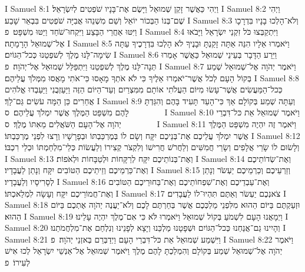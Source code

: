 I Samuel 8:1	וַיְהִי כַּאֲשֶׁר זָקֵן שְׁמוּאֵל וַיָּשֶׂם אֶת־בָּנָיו שֹׁפְטִים לְיִשְׂרָאֵל׃
I Samuel 8:2	וַיְהִי שֶׁם־בְּנוֹ הַבְּכוֹר יוֹאֵל וְשֵׁם מִשְׁנֵהוּ אֲבִיָּה שֹׁפְטִים בִּבְאֵר שָׁבַע׃
I Samuel 8:3	וְלֹא־הָלְכוּ בָנָיו בִּדְרָכָו וַיִּטּוּ אַחֲרֵי הַבָּצַע וַיִּקְחוּ־שֹׁחַד וַיַּטּוּ מִשְׁפָּט׃ {פ}
I Samuel 8:4	וַיִּתְקַבְּצוּ כֹּל זִקְנֵי יִשְׂרָאֵל וַיָּבֹאוּ אֶל־שְׁמוּאֵל הָרָמָתָה׃
I Samuel 8:5	וַיֹּאמְרוּ אֵלָיו הִנֵּה אַתָּה זָקַנְתָּ וּבָנֶיךָ לֹא הָלְכוּ בִּדְרָכֶיךָ עַתָּה שִׂימָה־לָּנוּ מֶלֶךְ לְשׁפְטֵנוּ כְּכל־הַגּוֹיִם׃
I Samuel 8:6	וַיֵּרַע הַדָּבָר בְּעֵינֵי שְׁמוּאֵל כַּאֲשֶׁר אָמְרוּ תְּנָה־לָּנוּ מֶלֶךְ לְשׁפְטֵנוּ וַיִּתְפַּלֵּל שְׁמוּאֵל אֶל־יְהֹוָה׃ {פ}
I Samuel 8:7	וַיֹּאמֶר יְהֹוָה אֶל־שְׁמוּאֵל שְׁמַע בְּקוֹל הָעָם לְכֹל אֲשֶׁר־יֹאמְרוּ אֵלֶיךָ כִּי לֹא אֹתְךָ מָאָסוּ כִּי־אֹתִי מָאֲסוּ מִמְּלֹךְ עֲלֵיהֶם׃
I Samuel 8:8	כְּכל־הַמַּעֲשִׂים אֲשֶׁר־עָשׂוּ מִיּוֹם הַעֲלֹתִי אוֹתָם מִמִּצְרַיִם וְעַד־הַיּוֹם הַזֶּה וַיַּעַזְבֻנִי וַיַּעַבְדוּ אֱלֹהִים אֲחֵרִים כֵּן הֵמָּה עֹשִׂים גַּם־לָךְ׃
I Samuel 8:9	וְעַתָּה שְׁמַע בְּקוֹלָם אַךְ כִּי־הָעֵד תָּעִיד בָּהֶם וְהִגַּדְתָּ לָהֶם מִשְׁפַּט הַמֶּלֶךְ אֲשֶׁר יִמְלֹךְ עֲלֵיהֶם׃ {ס}        
I Samuel 8:10	וַיֹּאמֶר שְׁמוּאֵל אֵת כּל־דִּבְרֵי יְהֹוָה אֶל־הָעָם הַשֹּׁאֲלִים מֵאִתּוֹ מֶלֶךְ׃ {ס}        
I Samuel 8:11	וַיֹּאמֶר זֶה יִהְיֶה מִשְׁפַּט הַמֶּלֶךְ אֲשֶׁר יִמְלֹךְ עֲלֵיכֶם אֶת־בְּנֵיכֶם יִקָּח וְשָׂם לוֹ בְּמֶרְכַּבְתּוֹ וּבְפָרָשָׁיו וְרָצוּ לִפְנֵי מֶרְכַּבְתּוֹ׃
I Samuel 8:12	וְלָשׂוּם לוֹ שָׂרֵי אֲלָפִים וְשָׂרֵי חֲמִשִּׁים וְלַחֲרֹשׁ חֲרִישׁוֹ וְלִקְצֹר קְצִירוֹ וְלַעֲשׂוֹת כְּלֵי־מִלְחַמְתּוֹ וּכְלֵי רִכְבּוֹ׃
I Samuel 8:13	וְאֶת־בְּנוֹתֵיכֶם יִקָּח לְרַקָּחוֹת וּלְטַבָּחוֹת וּלְאֹפוֹת׃
I Samuel 8:14	וְאֶת־שְׂדוֹתֵיכֶם וְאֶת־כַּרְמֵיכֶם וְזֵיתֵיכֶם הַטּוֹבִים יִקָּח וְנָתַן לַעֲבָדָיו׃
I Samuel 8:15	וְזַרְעֵיכֶם וְכַרְמֵיכֶם יַעְשֹׂר וְנָתַן לְסָרִיסָיו וְלַעֲבָדָיו׃
I Samuel 8:16	וְאֶת־עַבְדֵיכֶם וְאֶת־שִׁפְחוֹתֵיכֶם וְאֶת־בַּחוּרֵיכֶם הַטּוֹבִים וְאֶת־חֲמוֹרֵיכֶם יִקָּח וְעָשָׂה לִמְלַאכְתּוֹ׃
I Samuel 8:17	צֹאנְכֶם יַעְשֹׂר וְאַתֶּם תִּהְיוּ־לוֹ לַעֲבָדִים׃
I Samuel 8:18	וּזְעַקְתֶּם בַּיּוֹם הַהוּא מִלִּפְנֵי מַלְכְּכֶם אֲשֶׁר בְּחַרְתֶּם לָכֶם וְלֹא־יַעֲנֶה יְהֹוָה אֶתְכֶם בַּיּוֹם הַהוּא׃
I Samuel 8:19	וַיְמָאֲנוּ הָעָם לִשְׁמֹעַ בְּקוֹל שְׁמוּאֵל וַיֹּאמְרוּ לֹּא כִּי אִם־מֶלֶךְ יִהְיֶה עָלֵינוּ׃
I Samuel 8:20	וְהָיִינוּ גַם־אֲנַחְנוּ כְּכל־הַגּוֹיִם וּשְׁפָטָנוּ מַלְכֵּנוּ וְיָצָא לְפָנֵינוּ וְנִלְחַם אֶת־מִלְחֲמֹתֵנוּ׃
I Samuel 8:21	וַיִּשְׁמַע שְׁמוּאֵל אֵת כּל־דִּבְרֵי הָעָם וַיְדַבְּרֵם בְּאזְנֵי יְהֹוָה׃ {פ}
I Samuel 8:22	וַיֹּאמֶר יְהֹוָה אֶל־שְׁמוּאֵל שְׁמַע בְּקוֹלָם וְהִמְלַכְתָּ לָהֶם מֶלֶךְ וַיֹּאמֶר שְׁמוּאֵל אֶל־אַנְשֵׁי יִשְׂרָאֵל לְכוּ אִישׁ לְעִירוֹ׃ {פ}
